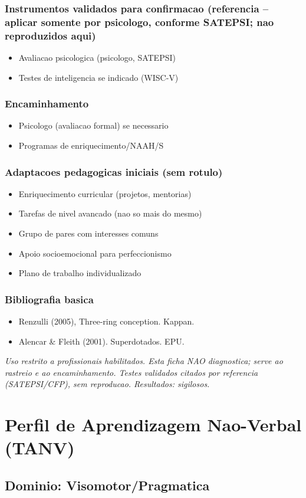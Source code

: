 \documentclass[a4paper,11pt]{book}
\newcommand{\avisolegal}{\par\medskip\noindent\footnotesize\itshape
\color{cinza}Uso restrito a profissionais habilitados. Esta ficha NAO diagnostica;
serve ao rastreio e ao encaminhamento. Testes validados citados por referencia
(SATEPSI/CFP), sem reproducao. Resultados: sigilosos.\color{black}\par}
\begin{document}
\subsection*{Instrumentos validados para confirmacao (referencia -- aplicar somente por psicologo, conforme SATEPSI; nao reproduzidos aqui)}
\begin{itemize}
\item Avaliacao psicologica (psicologo, SATEPSI)
\item Testes de inteligencia se indicado (WISC-V)
\end{itemize}
\subsection*{Encaminhamento}
\begin{itemize}
\item Psicologo (avaliacao formal) se necessario
\item Programas de enriquecimento/NAAH/S
\end{itemize}
\subsection*{Adaptacoes pedagogicas iniciais (sem rotulo)}
\begin{itemize}
\item Enriquecimento curricular (projetos, mentorias)
\item Tarefas de nivel avancado (nao so mais do mesmo)
\item Grupo de pares com interesses comuns
\item Apoio socioemocional para perfeccionismo
\item Plano de trabalho individualizado
\end{itemize}
\subsection*{Bibliografia basica}
\begin{itemize}
\item Renzulli (2005), Three-ring conception. Kappan.
\item Alencar \& Fleith (2001). Superdotados. EPU.
\end{itemize}
\avisolegal


\chapter{Perfil de Aprendizagem Nao-Verbal (TANV)}
\section*{Dominio: Visomotor/Pragmatica}
\end{document}
